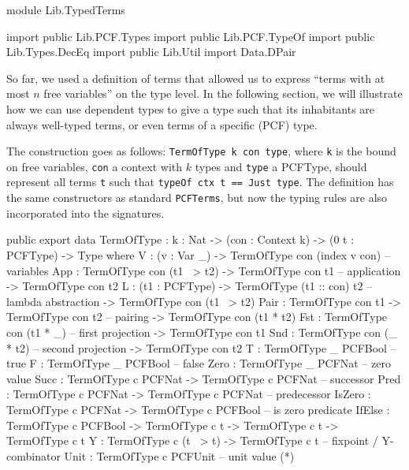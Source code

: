 \begin{hidden}
module Lib.TypedTerms

import public Lib.PCF.Types
import public Lib.PCF.TypeOf
import public Lib.Types.DecEq
import public Lib.Util
import Data.DPair


\end{hidden}

So far, we used a definition of terms that allowed us to express ``terms with at most $n$ free variables'' on the type level. In the following section, we will illustrate how we can use dependent types to give a type such that its inhabitants are always well-typed terms, or even terms of a specific (PCF) type.

The construction goes as follows: \lstinline{TermOfType k con type}, where \lstinline{k} is the bound on free variables, \lstinline{con} a context with $k$ types and \lstinline{type} a PCFType, should represent all terms \lstinline{t} such that \lstinline{typeOf ctx t == Just type}.
The definition has the same constructors as standard \lstinline{PCFTerms}, but now the typing rules are also incorporated into the
signatures.

\begin{code}
public export
data TermOfType : {k : Nat} -> (con : Context k) -> (0 t : PCFType) -> Type where
    V    : (v : Var _)  -> TermOfType con (index v con)            -- variables
    App  : TermOfType con (t1 ~> t2)  -> TermOfType con t1         -- application
            -> TermOfType con t2  
    L    : (t1 : PCFType)         -> TermOfType (t1 :: con) t2     -- lambda abstraction
            -> TermOfType con (t1 ~> t2)   
    Pair : TermOfType con t1 -> TermOfType con t2                  -- pairing
            -> TermOfType con (t1 * t2)
    Fst   : TermOfType con (t1 * _)                                -- first projection
            -> TermOfType con t1
    Snd   : TermOfType con (_ * t2)                                -- second projection
            -> TermOfType con t2
    T    : TermOfType _ PCFBool                                    -- true
    F    : TermOfType _ PCFBool                                    -- false
    Zero : TermOfType _ PCFNat                                     -- zero value
    Succ : TermOfType c PCFNat -> TermOfType c PCFNat              -- successor
    Pred : TermOfType c PCFNat -> TermOfType c PCFNat              -- predecessor
    IsZero : TermOfType c PCFNat -> TermOfType c PCFBool           -- is zero predicate
    IfElse : TermOfType c PCFBool -> TermOfType c t -> TermOfType c t
                  -> TermOfType c t
    Y     : TermOfType c (t ~> t) -> TermOfType c t                -- fixpoint / Y-combinator
    Unit  : TermOfType c PCFUnit                                   -- unit value (*)
\end{code}

